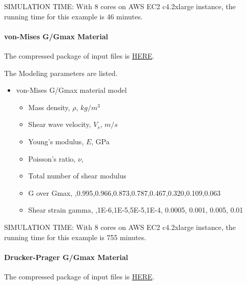 SIMULATION TIME: With 8 cores on AWS EC2 c4.2xlarge instance, the running time for this example is 46 minutes.

\paragraph{von-Mises G/Gmax Material}
The compressed package of input files is  
\href{http://sokocalo.engr.ucdavis.edu/~jeremic/Real_ESSI_Simulator/Real_ESSI_Short_Course_Examples_Dec2017/short-course-examples/nonlinear_analysis_steps/soil-structure/vonMisesGoverGmax/_all_files_packaged_for_vonMisesGoverGmax.tar.gz}{HERE}. 

The Modeling parameters are listed.
\begin{itemize}
  \item von-Mises G/Gmax material model 
  \begin{itemize}
    \item Mass density, $\rho$, \enspace {} $kg/m^3$
    \item Shear wave velocity, $V_s$, \enspace {} $m/s$
    \item Young's modulus, $E$, \enspace {} GPa
    \item Poisson's ratio, $\nu$, \enspace {}
    \item Total number of shear modulus \enspace {}
    \item G over Gmax, \enspace {},0.995,0.966,0.873,0.787,0.467,0.320,0.109,0.063
    \item Shear strain gamma, \enspace {},1E-6,1E-5,5E-5,1E-4, 0.0005, 0.001, 0.005, 0.01
  \end{itemize}
\end{itemize}

SIMULATION TIME: With 8 cores on AWS EC2 c4.2xlarge instance, the running time for this example is 755 minutes.

\paragraph{Drucker-Prager G/Gmax Material}
The compressed package of input files is  
\href{http://sokocalo.engr.ucdavis.edu/~jeremic/Real_ESSI_Simulator/Real_ESSI_Short_Course_Examples_Dec2017/short-course-examples/nonlinear_analysis_steps/soil-structure/DruckerPragerGoverGmax/_all_files_packaged_for_DruckerPragerGoverGmax.tar.gz}{HERE}. 

